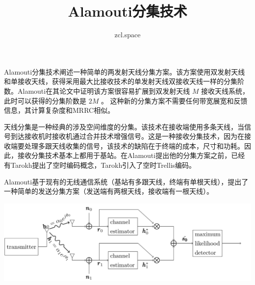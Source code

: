 \documentclass[10pt,a4paper,UTF8]{article}
\author{zcl.space}
\date{}
\title{Alamouti分集技术}
\begin{document}
\maketitle
\tableofcontents
{}
Alamouti分集技术阐述一种简单的两发射天线分集方案。该方案使用双发射天线和单接收天线，获得采用最大比接收技术的单发射天线双接收天线一样的分集阶数。Alamouti在其论文中证明该方案很容易扩展到双发射天线 \(M\) 接收天线系统，此时可以获得的分集阶数是 \(2M\) 。 这种新的分集方案不需要任何带宽展宽和反馈信息，其计算复杂度和MRRC相似。


天线分集是一种经典的涉及空间维度的分集。该技术在接收端使用多条天线，当信号到达接收机时接收机通过合并技术增强信号。这是一种接收分集技术，因为在接收端要处理多跟天线收集的信号，该技术的缺陷在于终端的成本，尺寸和功耗。因此，接收分集技术基本上都用于基站。在Alamouti提出他的分集方案之前，已经有Tarokh提出了空时编码概念，Tarokh引入了空时Trellis编码。


Alamouti基于现有的无线通信系统（基站有多跟天线，终端有单根天线），提出了一种简单的发送分集方案（发送端有两根天线，接收端有一根天线）。

\begin{center}
\includegraphics[width=.9\linewidth]{../../img/communication_wireless/20171018alamouti1.png}
\label{org2918445}
\end{center}
\end{document}
